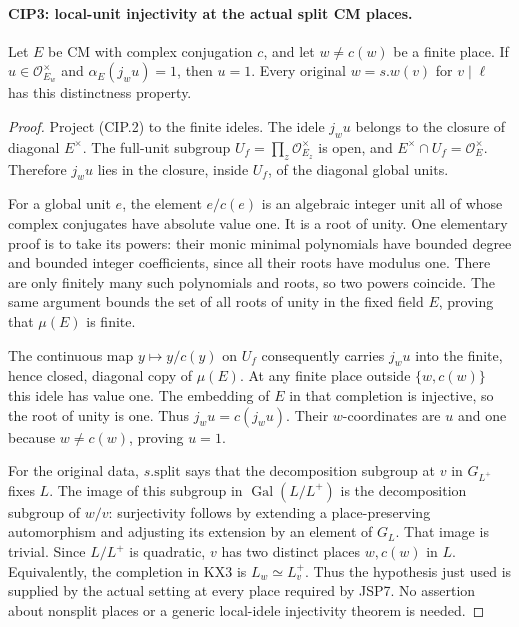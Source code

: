 \paragraph{CIP3: local-unit injectivity at the actual split CM places.}
\label{claim:CIP3}
Let $E$ be CM with complex conjugation $c$, and let $w\ne c(w)$
be a finite place.  If $u\in\mathcal O_{E_w}^{\times}$ and
$\alpha_E(j_wu)=1$, then $u=1$.  Every original $w=s.w(v)$ for
$v\mid\ell$ has this distinctness property.
\begin{proof}
Project (CIP.2) to the finite ideles.  The idele $j_wu$ belongs to
the closure of diagonal $E^\times$.  The full-unit subgroup
$U_f=\prod_z\mathcal O_{E_z}^{\times}$ is open, and
$E^\times\cap U_f=\mathcal O_E^\times$.  Therefore $j_wu$ lies in
the closure, inside $U_f$, of the diagonal global units.

For a global unit $e$, the element $e/c(e)$ is an algebraic integer
unit all of whose complex conjugates have absolute value one.
It is a root of unity.  One elementary proof is to take its powers:
their monic minimal polynomials have bounded degree and bounded
integer coefficients, since all their roots have modulus one.
There are only finitely many such polynomials and roots, so two
powers coincide.  The same argument bounds the set of all roots
of unity in the fixed field $E$, proving that $\mu(E)$ is finite.

The continuous map $y\mapsto y/c(y)$ on $U_f$ consequently carries
$j_wu$ into the finite, hence closed, diagonal copy of $\mu(E)$.
At any finite place outside $\{w,c(w)\}$ this idele has value one.
The embedding of $E$ in that completion is injective, so the root
of unity is one.  Thus $j_wu=c(j_wu)$.  Their $w$-coordinates are
$u$ and one because $w\ne c(w)$, proving $u=1$.

For the original data, $s.\mathrm{split}$ says that the
decomposition subgroup at $v$ in $G_{L^+}$ fixes $L$.
The image of this subgroup in $\operatorname{Gal}(L/L^+)$ is the
decomposition subgroup of $w/v$: surjectivity follows by extending
a place-preserving automorphism and adjusting its extension by an
element of $G_L$.  That image is trivial.  Since $L/L^+$ is
quadratic, $v$ has two distinct places $w,c(w)$ in $L$.
Equivalently, the completion in KX3 is $L_w\simeq L_v^+$.
Thus the hypothesis just used is supplied by the actual setting
at every place required by JSP7.  No assertion about nonsplit
places or a generic local-idele injectivity theorem is needed.
\end{proof}

